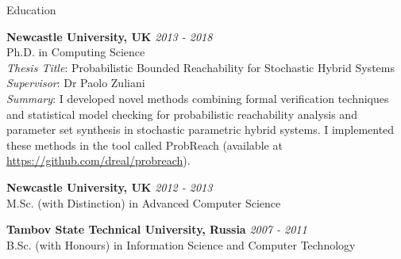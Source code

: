 \documentclass{resume} %
\begin{document}

\begin{rSection}{Education}


{\bf Newcastle University, UK} \hfill {\em 2013 - 2018} \\ 
Ph.D. in Computing Science  \\
{\em Thesis Title}: Probabilistic Bounded Reachability for Stochastic Hybrid Systems \\ 
{\em Supervisor}: Dr Paolo Zuliani \\
{\em Summary}: I developed novel methods combining formal verification techniques
and statistical model checking for probabilistic reachability analysis
and parameter set synthesis in stochastic parametric hybrid systems. 
I implemented these methods in the tool 
called ProbReach (available at \url{https://github.com/dreal/probreach}).

\smallskip 

{\bf Newcastle University, UK} \hfill {\em 2012 - 2013} \\ 
M.Sc. (with Distinction) in Advanced Computer Science
\smallskip 

{\bf Tambov State Technical University, Russia} \hfill {\em 2007 - 2011} \\ 
B.Sc. (with Honours) in Information Science and Computer Technology
\smallskip 

\end{rSection}









\end{document}
